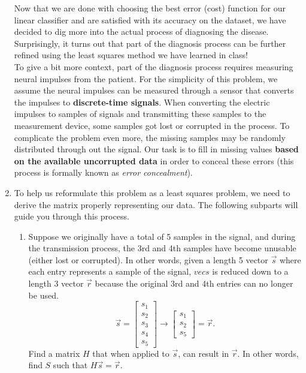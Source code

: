 \begin{enumerate}
Now that we are done with choosing the best error (cost) function for our linear classifier and are satisfied with its accuracy on the dataset, we have decided to dig more into the actual process of diagnosing the disease. Surprisingly, it turns out that part of the diagnosis process can be further refined using the least squares method we have learned in class! \\

To give a bit more context, part of the diagnosis process requires measuring neural impulses from the patient. For the simplicity of this problem, we assume the neural impulses can be measured through a sensor that converts the impulses to \textbf{discrete-time signals}. When converting the electric impulses to samples of signals and transmitting these samples to the measurement device, some samples got lost or corrupted in the process. To complicate the problem even more, the missing samples may be randomly distributed through out the signal. Our task is to fill in missing values \textbf{based on the available uncorrupted data} in order to conceal these errors (this process is formally known as \textit{error concealment}). \\

\item To help us reformulate this problem as a least squares problem, we need to derive the matrix properly representing our data. The following subparts will guide you through this process. 
\begin{enumerate}
    \item Suppose we originally have a total of 5 samples in the signal, and during the transmission process, the 3rd and 4th samples have become unusable (either lost or corrupted). In other words, given a length 5 vector $\vec{s}$ where each entry represents a sample of the signal, $vec{s}$ is reduced down to a length 3 vector $\vec{r}$ because the original 3rd and 4th entries can no longer be used.
    $$\vec{s} = \begin{bmatrix}
    s_1 \\
    s_2 \\
    s_3 \\
    s_4 \\
    s_5
    \end{bmatrix} \longrightarrow \begin{bmatrix}
    s_1 \\
    s_2 \\
    s_5
    \end{bmatrix} = \vec{r}.$$
    Find a matrix $H$ that when applied to $\vec{s}$, can result in $\vec{r}$. In other words, find $S$ such that $H\vec{s} = \vec{r}.$
    

\end{enumerate}
\end{enumerate}
